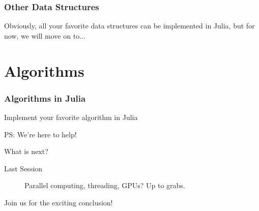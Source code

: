 \documentclass{beamer}
\begin{document}
\begin{frame}
\frametitle{Other Data Structures}
Obviously, all your favorite data structures can be implemented in Julia, but for now, we will move on to...
\end{frame}

\section{Algorithms}
\begin{frame}
\frametitle{Algorithms in Julia}

\pause
\begin{center}
\huge{Implement your favorite algorithm in Julia}

\vspace{0.5cm}
\small PS: We're here to help!
\end{center}

\end{frame}

\begin{frame}{What is next?}
  \begin{description}
    \item[Last Session] Parallel computing, threading, GPUs? Up to grabs.
  \end{description}

Join us for the exciting conclusion!
\end{frame}
\end{document}
